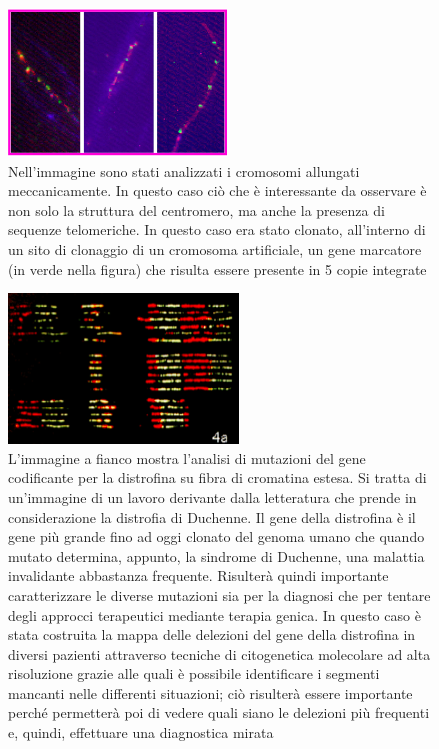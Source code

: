 \documentclass[11pt]{book}
\begin{document}
\begin{figure}[h!]
\centering
\includegraphics[scale=1.00]{img/16.png}
\caption{Nell’immagine sono stati analizzati i cromosomi allungati meccanicamente. In questo caso ciò che è interessante da osservare è non solo la struttura del centromero, ma anche la presenza di sequenze telomeriche. In questo caso era stato clonato, all’interno di un sito di clonaggio di un cromosoma artificiale, un gene marcatore (in verde nella figura) che risulta essere presente in 5 copie integrate}
\label{}
\end{figure}

\begin{figure}[h!]
\centering
\includegraphics[scale=1.00]{img/17.png}
\caption{L’immagine a fianco mostra l’analisi di mutazioni del gene codificante per la distrofina su fibra di cromatina estesa.
Si tratta di un’immagine di un lavoro derivante dalla letteratura che prende in considerazione la distrofia di Duchenne. Il gene della distrofina è il gene più grande fino ad oggi clonato del genoma umano che quando mutato determina, appunto, la sindrome di Duchenne, una malattia invalidante abbastanza frequente. Risulterà quindi importante caratterizzare le diverse mutazioni sia per la diagnosi che per tentare degli approcci terapeutici mediante terapia genica.
In questo caso è stata costruita la mappa delle delezioni del gene della distrofina in diversi pazienti attraverso tecniche di citogenetica molecolare ad alta risoluzione grazie alle quali è possibile identificare i segmenti mancanti nelle differenti situazioni; ciò risulterà essere importante perché permetterà poi di vedere quali siano le delezioni più frequenti e, quindi, effettuare una diagnostica mirata}
\label{}
\end{figure}
\end{document}
